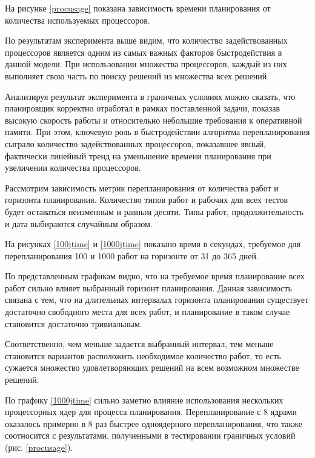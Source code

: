 На рисунке \ref{procusage} показана зависимость времени планирования от количества используемых процессоров.


По результатам эксперимента выше видим, что количество задействованных процессоров является одним из самых важных факторов быстродействия в данной модели. При использовании множества процессоров, каждый из них выполняет свою часть по поиску решений из множества всех решений.

Анализируя результат эксперимента в граничных условиях можно сказать, что планировщик корректно отработал в рамках поставленной задачи, показав высокую скорость работы и относительно небольшие требования к оперативной памяти. При этом, ключевую роль в быстродействии алгоритма перепланирования сыграло количество задействованных процессоров, показавшее явный, фактически линейный тренд на уменьшение времени планирования при увеличении количества процессоров.

Рассмотрим зависимость метрик перепланирования от количества работ и горизонта планирования. Количество типов работ и рабочих для всех тестов будет оставаться неизменным и равным десяти. Типы работ, продолжительность и дата выбираются случайным образом.

На рисунках \ref{100jtime} и \ref{1000jtime} показано время в секундах, требуемое для перепланирования 100 и 1000 работ на горизонте от 31 до 365 дней.



По представленным графикам видно, что на требуемое время планирование всех работ сильно влияет выбранный горизонт планирования. Данная зависимость связана с тем, что на длительных интервалах горизонта планирования существует достаточно свободного места для всех работ, и планирование в таком случае становится достаточно тривиальным.

Соответственно, чем меньше задается выбранный интервал, тем меньше становится вариантов расположить необходимое количество работ, то есть сужается множество удовлетворяющих решений на всем возможном множестве решений.

По графику \ref{1000jtime} сильно заметно влияние использования нескольких процессорных ядер для процесса планирования. Перепланирование с 8 ядрами оказалось примерно в 8 раз быстрее одноядерного перепланирования, что также соотносится с результатами, полученными в тестировании граничных условий (рис. \ref{procusage}).

